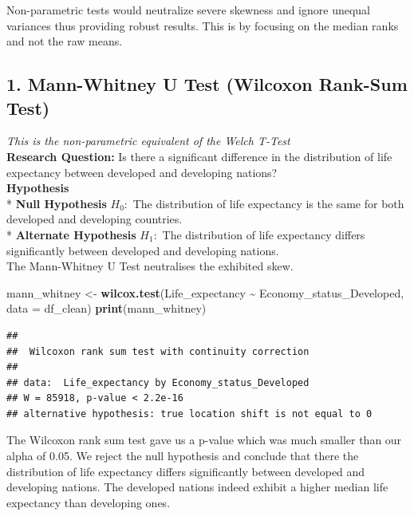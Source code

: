 \documentclass[
  10pt,
]{article}
\newenvironment{Shaded}{\begin{snugshade}}{\end{snugshade}}
\newcommand{\AttributeTok}[1]{\textcolor[rgb]{0.13,0.29,0.53}{#1}}
\newcommand{\FunctionTok}[1]{\textcolor[rgb]{0.13,0.29,0.53}{\textbf{#1}}}
\newcommand{\NormalTok}[1]{#1}
\newcommand{\OtherTok}[1]{\textcolor[rgb]{0.56,0.35,0.01}{#1}}
\newcommand{\SpecialCharTok}[1]{\textcolor[rgb]{0.81,0.36,0.00}{\textbf{#1}}}
\begin{document}
Non-parametric tests would neutralize severe skewness and ignore unequal
variances thus providing robust results. This is by focusing on the
median ranks and not the raw means.\\

\subsection{1. Mann-Whitney U Test (Wilcoxon Rank-Sum
Test)}\label{mann-whitney-u-test-wilcoxon-rank-sum-test}

\emph{This is the non-parametric equivalent of the Welch T-Test}\\

\textbf{Research Question:} Is there a significant difference in the
distribution of life expectancy between developed and developing
nations?\\

\textbf{Hypothesis}\\
* \textbf{Null Hypothesis} \(H_0:\) The distribution of life expectancy
is the same for both developed and developing countries.\\
* \textbf{Alternate Hypothesis} \(H_1:\) The distribution of life
expectancy differs significantly between developed and developing
nations.\\

The Mann-Whitney U Test neutralises the exhibited skew.\\

\begin{Shaded}
\begin{Highlighting}[]
\NormalTok{mann\_whitney }\OtherTok{\textless{}{-}} \FunctionTok{wilcox.test}\NormalTok{(Life\_expectancy }\SpecialCharTok{\textasciitilde{}}\NormalTok{ Economy\_status\_Developed, }\AttributeTok{data =}\NormalTok{ df\_clean)}
\FunctionTok{print}\NormalTok{(mann\_whitney)}
\end{Highlighting}
\end{Shaded}

\begin{verbatim}
## 
##  Wilcoxon rank sum test with continuity correction
## 
## data:  Life_expectancy by Economy_status_Developed
## W = 85918, p-value < 2.2e-16
## alternative hypothesis: true location shift is not equal to 0
\end{verbatim}

The Wilcoxon rank sum test gave us a p-value which was much smaller than
our alpha of 0.05. We reject the null hypothesis and conclude that there
the distribution of life expectancy differs significantly between
developed and developing nations. The developed nations indeed exhibit a
higher median life expectancy than developing ones.\\
\end{document}
